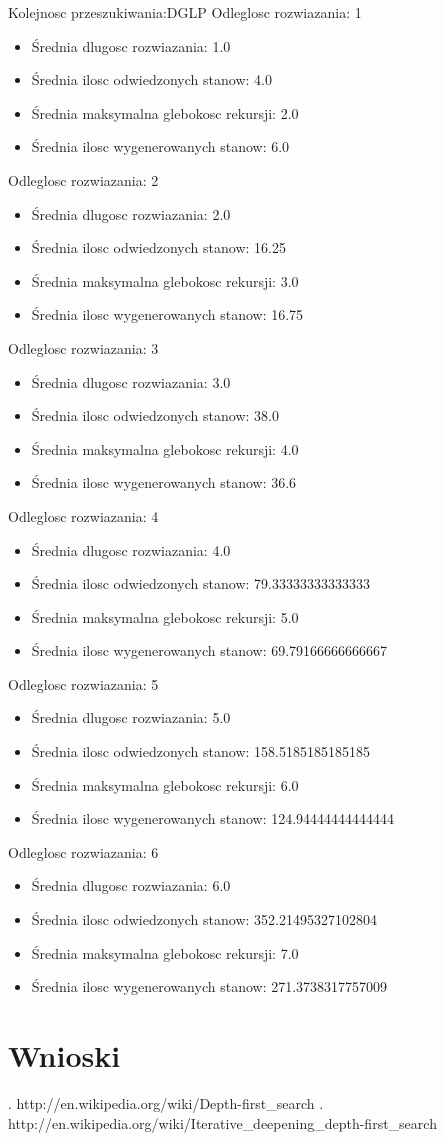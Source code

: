 \documentclass{classrep}
\begin{document}
		Kolejnosc przeszukiwania:DGLP
		Odleglosc rozwiazania: 1
		\begin{itemize}
			\item Średnia dlugosc rozwiazania: 1.0
			\item Średnia ilosc odwiedzonych stanow: 4.0
			\item Średnia maksymalna glebokosc rekursji: 2.0
			\item Średnia ilosc wygenerowanych stanow: 6.0
		\end{itemize}
		Odleglosc rozwiazania: 2
		\begin{itemize}
			\item Średnia dlugosc rozwiazania: 2.0
			\item Średnia ilosc odwiedzonych stanow: 16.25
			\item Średnia maksymalna glebokosc rekursji: 3.0
			\item Średnia ilosc wygenerowanych stanow: 16.75
		\end{itemize}
		Odleglosc rozwiazania: 3
		\begin{itemize}
			\item Średnia dlugosc rozwiazania: 3.0
			\item Średnia ilosc odwiedzonych stanow: 38.0
			\item Średnia maksymalna glebokosc rekursji: 4.0
			\item Średnia ilosc wygenerowanych stanow: 36.6
		\end{itemize}
		Odleglosc rozwiazania: 4
		\begin{itemize}
			\item Średnia dlugosc rozwiazania: 4.0
			\item Średnia ilosc odwiedzonych stanow: 79.33333333333333
			\item Średnia maksymalna glebokosc rekursji: 5.0
			\item Średnia ilosc wygenerowanych stanow: 69.79166666666667
		\end{itemize}
		Odleglosc rozwiazania: 5
		\begin{itemize}
			\item Średnia dlugosc rozwiazania: 5.0
			\item Średnia ilosc odwiedzonych stanow: 158.5185185185185
			\item Średnia maksymalna glebokosc rekursji: 6.0
			\item Średnia ilosc wygenerowanych stanow: 124.94444444444444
		\end{itemize}
		Odleglosc rozwiazania: 6
		\begin{itemize}
			\item Średnia dlugosc rozwiazania: 6.0
			\item Średnia ilosc odwiedzonych stanow: 352.21495327102804
			\item Średnia maksymalna glebokosc rekursji: 7.0
			\item Średnia ilosc wygenerowanych stanow: 271.3738317757009
		\end{itemize}
		
	\section{Wnioski}
	
	\begin{thebibliography}{0}
	  \bibitem. http://en.wikipedia.org/wiki/Depth-first\_search
	  \bibitem. http://en.wikipedia.org/wiki/Iterative\_deepening\_depth-first\_search   
	\end{thebibliography}
\end{document}
